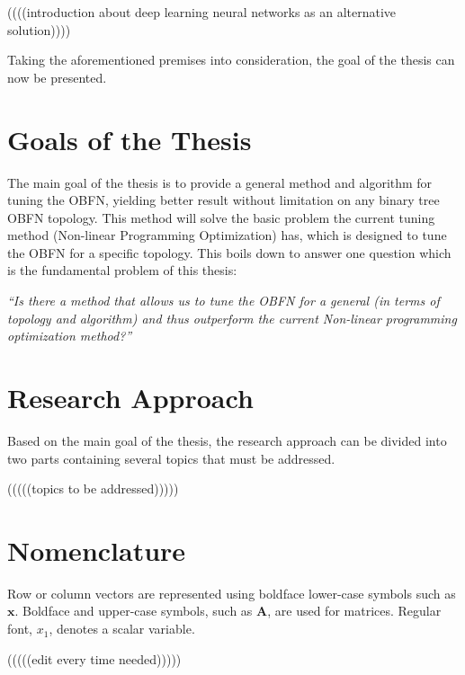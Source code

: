 ((((introduction about deep learning neural networks as an alternative solution))))

Taking the aforementioned premises into consideration, the goal of the thesis can now be
presented.

\section{Goals of the Thesis}
The main goal of the thesis is to provide a general method and algorithm for tuning the \ac{OBFN}, yielding better result without limitation on any binary tree \ac{OBFN} topology. This method will solve the basic problem the current tuning method (Non-linear Programming Optimization) has, which is designed to tune the \ac{OBFN} for a specific topology. This boils down to answer one question which is the fundamental
problem of this thesis:

\textit{``Is there a method that allows us to tune the OBFN for a general (in terms of topology and algorithm) and thus outperform the current Non-linear programming optimization method?''}


\section{Research Approach}

Based on the main goal of the thesis, the research approach can be divided into two parts containing several topics that must be addressed.

(((((topics to be addressed)))))

\section{Nomenclature}

Row or column vectors are represented using boldface lower-case symbols such as $\textbf{x}$. Boldface and upper-case symbols, such as $\textbf{A}$, are used for matrices. Regular font, $x_1$, denotes a scalar variable.

(((((edit every time needed)))))

